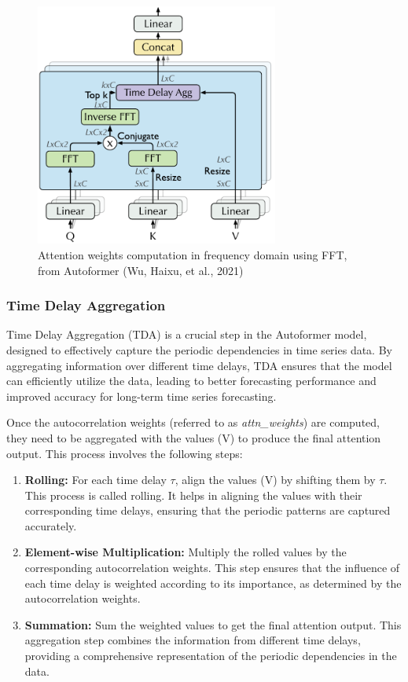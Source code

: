 \begin{figure}[htbp]
    \centering
    \includegraphics[width=8cm]{3_ChapterTranformerVariants/figuras/AttentionWeightsComputation.pdf}
    \caption{Attention weights computation in frequency domain using FFT, from Autoformer (Wu, Haixu, et al., 2021)\cite{wu2022autoformerdecompositiontransformersautocorrelation}}
    \end{figure}



\subsubsection{Time Delay Aggregation}
Time Delay Aggregation (TDA) is a crucial step in the Autoformer model, designed to effectively capture the periodic dependencies in time series data. By aggregating information over different time delays, TDA ensures that the model can efficiently utilize the data, leading to better forecasting performance and improved accuracy for long-term time series forecasting.

Once the autocorrelation weights (referred to as \textit{attn\_weights}) are computed, they need to be aggregated with the values (V) to produce the final attention output. This process involves the following steps:

\begin{enumerate}
    \item \textbf{Rolling:} For each time delay \( \tau \), align the values (V) by shifting them by \( \tau \). This process is called rolling. It helps in aligning the values with their corresponding time delays, ensuring that the periodic patterns are captured accurately.
    \item \textbf{Element-wise Multiplication:} Multiply the rolled values by the corresponding autocorrelation weights. This step ensures that the influence of each time delay is weighted according to its importance, as determined by the autocorrelation weights.
    \item \textbf{Summation:} Sum the weighted values to get the final attention output. This aggregation step combines the information from different time delays, providing a comprehensive representation of the periodic dependencies in the data.
\end{enumerate}

